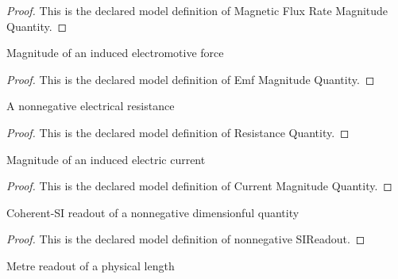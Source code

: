 \begin{proof}
  This is the declared model definition of Magnetic Flux Rate Magnitude Quantity.
\end{proof}
\begin{definition}
  \label{def:physics:phyx-mini-0931:phyxminiproblems-problemphyxmini0931-emfmagnitudequantity}
  Magnitude of an induced electromotive force
\end{definition}
\begin{proof}
  This is the declared model definition of Emf Magnitude Quantity.
\end{proof}
\begin{definition}
  \label{def:physics:phyx-mini-0931:phyxminiproblems-problemphyxmini0931-resistancequantity}
  A nonnegative electrical resistance
\end{definition}
\begin{proof}
  This is the declared model definition of Resistance Quantity.
\end{proof}
\begin{definition}
  \label{def:physics:phyx-mini-0931:phyxminiproblems-problemphyxmini0931-currentmagnitudequantity}
  Magnitude of an induced electric current
\end{definition}
\begin{proof}
  This is the declared model definition of Current Magnitude Quantity.
\end{proof}
\begin{definition}
  \label{def:physics:phyx-mini-0931:phyxminiproblems-problemphyxmini0931-nonnegativesireadout}
  Coherent-SI readout of a nonnegative dimensionful quantity
\end{definition}
\begin{proof}
  This is the declared model definition of nonnegative SIReadout.
\end{proof}
\begin{definition}
  \label{def:physics:phyx-mini-0931:phyxminiproblems-problemphyxmini0931-lengthinmeters}
  Metre readout of a physical length
\end{definition}
